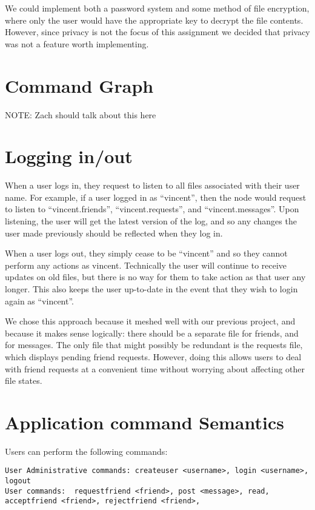 \documentclass[11pt]{article}
\begin{document}
We could implement both a password system and some method of file encryption, where only the user would have the appropriate key to decrypt the file contents. However, since privacy is not the focus of this assignment we decided that privacy was not a feature worth implementing. 

\section{Command Graph}

NOTE: Zach should talk about this here


\section{Logging in/out}

When a user logs in, they request to listen to all files associated with their user name. For example, if a user logged in as ``vincent'', then the node would request to listen to ``vincent.friends'', ``vincent.requests'', and ``vincent.messages''. Upon listening, the user will get the latest version of the log, and so any changes the user made previously should be reflected when they log in. 

When a user logs out, they simply cease to be ``vincent'' and so they cannot perform any actions as vincent. Technically the user will continue to receive updates on old files, but there is no way for them to take action as that user any longer. This also keeps the user up-to-date in the event that they wish to login again as ``vincent''.

We chose this approach because it meshed well with our previous project, and because it makes sense logically: there should be a separate file for friends, and for messages. The only file that might possibly be redundant is the requests file, which displays pending friend requests. However, doing this allows users to deal with friend requests at a convenient time without worrying about affecting other file states.

\section{Application command Semantics}

Users can perform the following commands:
\begin{verbatim}
User Administrative commands: createuser <username>, login <username>, logout
User commands:  requestfriend <friend>, post <message>, read, acceptfriend <friend>, rejectfriend <friend>,
\end{verbatim}
\end{document}
